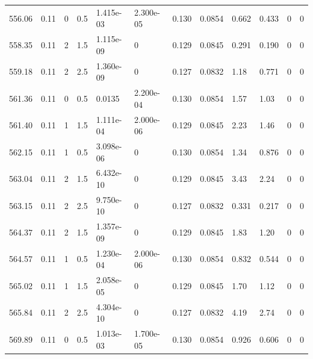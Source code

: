 \documentclass[preview]{standalone}
\begin{document}
{{{{{{{{{\begin{tabular}{L{1.2cm}C{1.2cm} C{0.3cm}C{0.5cm} C{1.4cm}C{1.4cm} C{1.4cm}C{1.4cm} C{1.6cm}C{1.6cm} C{1.6cm}C{1.6cm}}
  556.06  &  0.11  & 0     & 0.5 &  1.415e-03  & 2.300e-05  &  0.130&   0.0854& 0.662 & 0.433   &  0 & 0  \\ 
  558.35  &  0.11  & 2     & 1.5 &  1.115e-09  & 0  &  0.129&   0.0845& 0.291 & 0.190   &  0 & 0  \\ 
  559.18  &  0.11  & 2     & 2.5 &  1.360e-09  & 0  &  0.127&   0.0832& 1.18 & 0.771   &  0 & 0  \\ 
  561.36  &  0.11  & 0     & 0.5 &  0.0135  & 2.200e-04  &  0.130&   0.0854& 1.57 & 1.03   &  0 & 0  \\ 
  561.40  &  0.11  & 1     & 1.5 &  1.111e-04  & 2.000e-06  &  0.129&   0.0845& 2.23 & 1.46   &  0 & 0  \\ 
  562.15  &  0.11  & 1     & 0.5 &  3.098e-06  & 0  &  0.130&   0.0854& 1.34 & 0.876   &  0 & 0  \\ 
  563.04  &  0.11  & 2     & 1.5 &  6.432e-10  & 0  &  0.129&   0.0845& 3.43 & 2.24   &  0 & 0  \\ 
  563.15  &  0.11  & 2     & 2.5 &  9.750e-10  & 0  &  0.127&   0.0832& 0.331 & 0.217   &  0 & 0  \\ 
  564.37  &  0.11  & 2     & 1.5 &  1.357e-09  & 0  &  0.129&   0.0845& 1.83 & 1.20   &  0 & 0  \\ 
  564.57  &  0.11  & 1     & 0.5 &  1.230e-04  & 2.000e-06  &  0.130&   0.0854& 0.832 & 0.544   &  0 & 0  \\ 
  565.02  &  0.11  & 1     & 1.5 &  2.058e-05  & 0  &  0.129&   0.0845& 1.70 & 1.12   &  0 & 0  \\ 
  565.84  &  0.11  & 2     & 2.5 &  4.304e-10  & 0  &  0.127&   0.0832& 4.19 & 2.74   &  0 & 0  \\ 
  569.89  &  0.11  & 0     & 0.5 &  1.013e-03  & 1.700e-05  &  0.130&   0.0854& 0.926 & 0.606   &  0 & 0  \\ 
\hline 
\end{tabular} 

}}}}}}}}}
\end{document}
